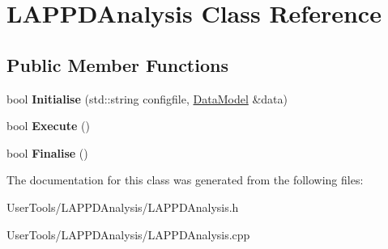 \hypertarget{classLAPPDAnalysis}{
\section{LAPPDAnalysis Class Reference}
\label{classLAPPDAnalysis}
}
\subsection*{Public Member Functions}
\begin{DoxyCompactItemize}
\item 
\hypertarget{classLAPPDAnalysis_a3777b97151a13ebc1be6054b057b7354}{
bool {\bfseries Initialise} (std::string configfile, \hyperlink{classDataModel}{DataModel} \&data)}
\label{classLAPPDAnalysis_a3777b97151a13ebc1be6054b057b7354}

\item 
\hypertarget{classLAPPDAnalysis_a0bda0e3aa26131d460e8f11ac2d2d50d}{
bool {\bfseries Execute} ()}
\label{classLAPPDAnalysis_a0bda0e3aa26131d460e8f11ac2d2d50d}

\item 
\hypertarget{classLAPPDAnalysis_acbda60c00d2f2bceca57ff9f9098e7a7}{
bool {\bfseries Finalise} ()}
\label{classLAPPDAnalysis_acbda60c00d2f2bceca57ff9f9098e7a7}

\end{DoxyCompactItemize}


The documentation for this class was generated from the following files:\begin{DoxyCompactItemize}
\item 
UserTools/LAPPDAnalysis/LAPPDAnalysis.h\item 
UserTools/LAPPDAnalysis/LAPPDAnalysis.cpp\end{DoxyCompactItemize}
